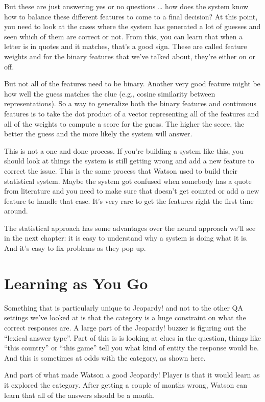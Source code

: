 But these are just answering yes or no questions … how does the system know how to balance these different features to come to a final decision?  At this point, you need to look at the cases where the system has generated a lot of guesses and seen which of them are correct or not.  From this, you can learn that when a letter is in quotes and it matches, that’s a good sign.  These are called feature weights and for the binary features that we’ve talked about, they’re either on or off.

But not all of the features need to be binary.  Another very good feature might be how well the guess matches the clue (e.g., cosine similarity between representations).  So a way to generalize both the binary features and continuous features is to take the dot product of a vector representing all of the features and all of the weights to compute a score for the guess.  The higher the score, the better the guess and the more likely the system will answer.

This is not a one and done process.  If you're building a system like
this, you should look at things the system is still getting wrong and
add a new feature to correct the issue.  This is the same process that
Watson used to build their statistical system.  Maybe the system got
confused when somebody has a quote from literature and you need to
make sure that doesn’t get counted or add a new feature to handle that
case.  It’s very rare to get the features right the first time around.

The statistical approach has some advantages over the neural approach
we'll see in the next chapter: it is easy to understand why a system
is doing what it is.  And it's easy to fix problems as they pop up.

\section{Learning as You Go}

Something that is particularly unique to Jeopardy! and not to the
other QA settings we’ve looked at is that the category is a huge
constraint on what the correct responses are.  A large part of the
Jeopardy! buzzer is figuring out the “lexical answer type”.  Part of
this is is looking at clues in the question, things like “this
country” or “this game” tell you what kind of entity the response
would be.  And this is sometimes at odds with the category, as shown
here.


And part of what made Watson a good Jeopardy! Player is that it would learn as it explored the category.  After getting a couple of months wrong, Watson can learn that all of the answers should be a month.

